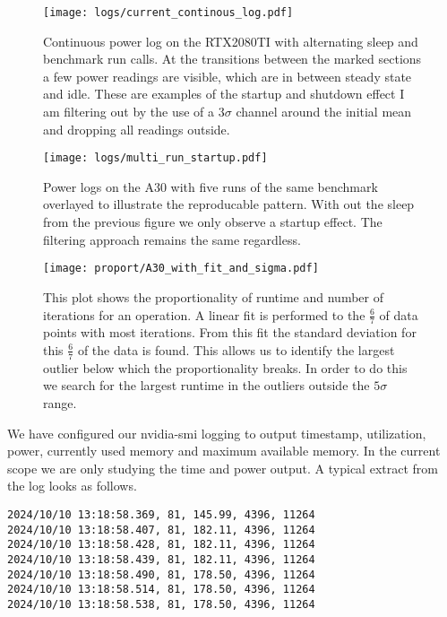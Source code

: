 \documentclass[conference]{IEEEtran}
\begin{document}
\begin{figure}
    \texttt{[image: logs/current\_continous\_log.pdf]}
    \caption{Continuous power log on the RTX2080TI with alternating sleep and benchmark run calls. At the transitions between the marked sections a few power readings are visible, which are in between steady state and idle. These are examples of the startup and shutdown effect I am filtering out by the use of a $3 \sigma$ channel around the initial mean and dropping all readings outside.}
    \label{fig:startup1}
    \texttt{[image: logs/multi\_run\_startup.pdf]}
    \caption{Power logs on the A30 with five runs of the same benchmark overlayed to illustrate the reproducable pattern. With out the sleep from the previous figure we only observe a startup effect. The filtering approach remains the same regardless.}
    \label{fig:startup2}
\end{figure}

\begin{figure}
    \centering
    \texttt{[image: proport/A30\_with\_fit\_and\_sigma.pdf]}
    \caption{This plot shows the proportionality of runtime and number of iterations for an operation. A linear fit is performed to the $\frac{6}{7}$ of data points with most iterations. From this fit the standard deviation for this $\frac{6}{7}$ of the data is found. This allows us to identify the largest outlier below which the proportionality breaks. In order to do this we search for the largest runtime in the outliers outside the $5\sigma$ range.}
    \label{fig:proport}
\end{figure}

We have configured our nvidia-smi logging to output timestamp, utilization, power, currently used memory and maximum available memory. In the current scope we are only studying the time and power output. A typical extract from the log looks as follows.


\begin{footnotesize} %
\begin{verbatim}
2024/10/10 13:18:58.369, 81, 145.99, 4396, 11264
2024/10/10 13:18:58.407, 81, 182.11, 4396, 11264
2024/10/10 13:18:58.428, 81, 182.11, 4396, 11264
2024/10/10 13:18:58.439, 81, 182.11, 4396, 11264
2024/10/10 13:18:58.490, 81, 178.50, 4396, 11264
2024/10/10 13:18:58.514, 81, 178.50, 4396, 11264
2024/10/10 13:18:58.538, 81, 178.50, 4396, 11264
\end{verbatim}
\end{footnotesize}
\end{document}
